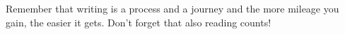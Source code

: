 Remember that writing is a process and a journey and the more mileage you gain, the easier it gets.
Don't forget that also reading counts!




